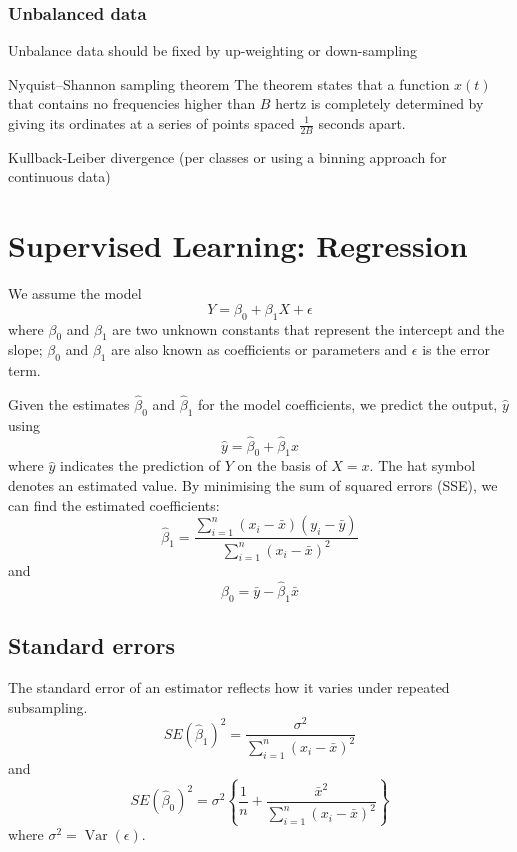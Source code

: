 \documentclass[12pt,a4paper]{article}
\begin{document}
\subsubsection{Unbalanced data}
Unbalance data should be fixed by up-weighting or down-sampling
\\
\begin{theorem}
    {Nyquist–Shannon sampling theorem}{
    The theorem states that a function $x(t)$ that contains no frequencies higher than $B$ hertz is completely determined by giving its ordinates at a series of points spaced $\frac{1}{2 B}$ seconds apart.
    }
\end{theorem}
\begin{theorem}
    {Kullback-Leiber divergence (per classes or using a binning approach for continuous data)
    }{}
\end{theorem}
\section{Supervised Learning: Regression}
We assume the model
$$
Y=\beta_0+\beta_1 X+\epsilon
$$
where $\beta_0$ and $\beta_1$ are two unknown constants that represent the intercept and the slope; $\beta_0$ and $\beta_1$ are also known as coefficients or parameters and $\epsilon$ is the error term.

Given the estimates $\hat{\beta}_0$ and $\hat{\beta}_1$ for the model coefficients, we predict the output, $\hat{y}$ using
$$
\hat{y}=\hat{\beta}_0+\hat{\beta}_1 x
$$
where $\hat{y}$ indicates the prediction of $Y$ on the basis of $X=x$. The hat symbol denotes an estimated value. By minimising the sum of squared errors (SSE), we can find the estimated coefficients:
\begin{equation*}
\hat{\beta}_1=\frac{\sum_{i=1}^n\left(x_i-\bar{x}\right)\left(y_i-\bar{y}\right)}{\sum_{i=1}^n\left(x_i-\bar{x}\right)^2}
\end{equation*}
and
\begin{equation*}
\hat{\beta}_0=\bar{y}-\hat{\beta}_1 \bar{x}
\end{equation*}


\subsection{Standard errors}
The standard error of an estimator reflects how it varies under repeated subsampling.
\begin{equation*}
S E\left(\hat{\beta}_1\right)^2=\frac{\sigma^2}{\sum_{i=1}^n\left(x_i-\bar{x}\right)^2}
\end{equation*}
and
\begin{equation*}
S E\left(\hat{\beta}_0\right)^2=\sigma^2\left\{\frac{1}{n}+\frac{\bar{x}^2}{\sum_{i=1}^n\left(x_i-\bar{x}\right)^2}\right\}
\end{equation*}
where $\sigma^2=\operatorname{Var}(\epsilon)$.
\end{document}
